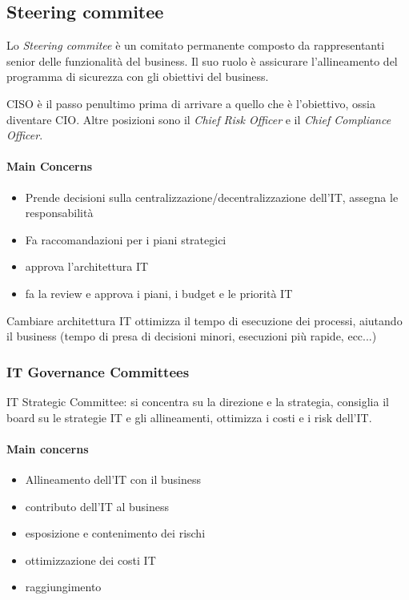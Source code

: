 \subsection{Steering commitee}
Lo \textit{Steering commitee} è un comitato permanente composto da 
rappresentanti senior delle funzionalità del business. Il suo ruolo è 
assicurare l'allineamento del programma di sicurezza con gli obiettivi del 
business.

CISO è il passo penultimo prima di arrivare a quello che è l'obiettivo, ossia 
diventare CIO. Altre posizioni sono il \textit{Chief Risk Officer} e il 
\textit{Chief Compliance Officer}.

\paragraph*{Main Concerns}

\begin{itemize}
\item Prende decisioni sulla centralizzazione/decentralizzazione dell'IT, 
assegna le responsabilità
\item Fa raccomandazioni per i piani strategici
\item approva l'architettura IT
\item fa la review e approva i piani, i budget e le priorità IT
\end{itemize}

Cambiare architettura IT ottimizza il tempo di esecuzione dei processi, aiutando 
il business (tempo di presa di decisioni minori, esecuzioni più rapide, ecc...)

\subsubsection{IT Governance Committees}
IT Strategic Committee: si concentra su la direzione e la strategia, consiglia 
il board su le strategie IT e gli allineamenti, ottimizza i costi e i risk 
dell'IT.

\paragraph{Main concerns}

\begin{itemize}
\item Allineamento dell'IT con il business
\item contributo dell'IT al business
\item esposizione e contenimento dei rischi
\item ottimizzazione dei costi IT
\item raggiungimento 
\end{itemize}


